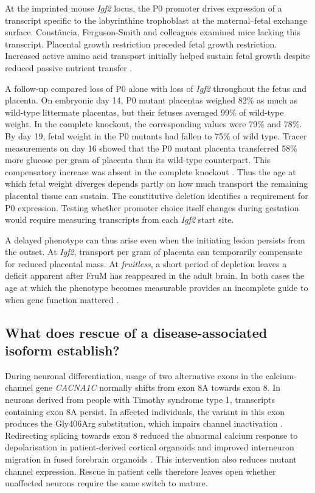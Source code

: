 \documentclass[11pt,a4paper]{article}
\begin{document}
At the imprinted mouse \textit{Igf2} locus, the P0 promoter drives expression of a transcript specific to the labyrinthine trophoblast at the maternal--fetal exchange surface. Constância, \mbox{Ferguson-Smith} and colleagues examined mice lacking this transcript. Placental growth restriction preceded fetal growth restriction. Increased active amino acid transport initially helped sustain fetal growth despite reduced passive nutrient transfer \cite{Constancia2002}.

A follow-up compared loss of P0 alone with loss of \textit{Igf2} throughout the fetus and placenta. On embryonic day 14, P0 mutant placentas weighed 82\% as much as wild-type littermate placentas, but their fetuses averaged 99\% of wild-type weight. In the complete knockout, the corresponding values were 79\% and 78\%. By day 19, fetal weight in the P0 mutants had fallen to 75\% of wild type. Tracer measurements on day 16 showed that the P0 mutant placenta transferred 58\% more glucose per gram of placenta than its wild-type counterpart. This compensatory increase was absent in the complete knockout \cite{Constancia2005}. Thus the age at which fetal weight diverges depends partly on how much transport the remaining placental tissue can sustain. The constitutive deletion identifies a requirement for P0 expression. Testing whether promoter choice itself changes during gestation would require measuring transcripts from each \textit{Igf2} start site.

A delayed phenotype can thus arise even when the initiating lesion persists from the outset. At \textit{Igf2}, transport per gram of placenta can temporarily compensate for reduced placental mass. At \textit{fruitless}, a short period of depletion leaves a deficit apparent after FruM has reappeared in the adult brain. In both cases the age at which the phenotype becomes measurable provides an incomplete guide to when gene function mattered \cite{Constancia2005,Chen2021Fru}.

\subsection{What does rescue of a disease-associated isoform establish?}

During neuronal differentiation, usage of two alternative exons in the calcium-channel gene \textit{CACNA1C} normally shifts from exon 8A towards exon 8. In neurons derived from people with Timothy syndrome type 1, transcripts containing exon 8A persist. In affected individuals, the variant in this exon produces the Gly406Arg substitution, which impairs channel inactivation \cite{Panagiotakos2019}. Redirecting splicing towards exon 8 reduced the abnormal calcium response to depolarisation in patient-derived cortical organoids and improved interneuron migration in fused forebrain organoids \cite{Chen2024TS}. This intervention also reduces mutant channel expression. Rescue in patient cells therefore leaves open whether unaffected neurons require the same switch to mature.
\end{document}

